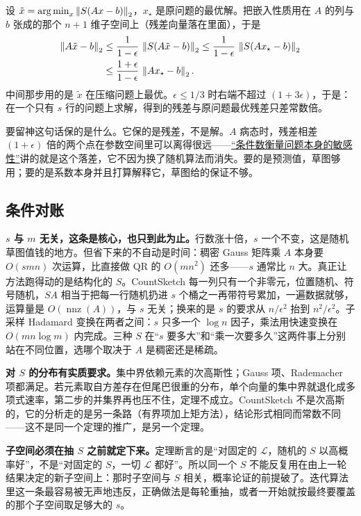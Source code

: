 设 \(\tilde x=\operatorname*{arg\,min}_x\left\lVert S(Ax-b)\right\rVert_2\)，\(x_\star\) 是原问题的最优解。把嵌入性质用在 \(A\) 的列与 \(b\) 张成的那个 \(n+1\) 维子空间上（残差向量落在里面），于是
\[
\begin{aligned}
\left\lVert A\tilde x-b\right\rVert_2
&\le\frac{1}{1-\epsilon}\,\left\lVert S(A\tilde x-b)\right\rVert_2
 \le\frac{1}{1-\epsilon}\,\left\lVert S(Ax_\star-b)\right\rVert_2\\
&\le\frac{1+\epsilon}{1-\epsilon}\,\left\lVert Ax_\star-b\right\rVert_2 .
\end{aligned}
\]
中间那步用的是 \(\tilde x\) 在压缩问题上最优。\(\epsilon\le1/3\) 时右端不超过 \((1+3\epsilon)\)，于是：在一个只有 \(s\) 行的问题上求解，得到的残差与原问题最优残差只差常数倍。

要留神这句话保的是什么。它保的是残差，不是解。\(A\) 病态时，残差相差 \((1+\epsilon)\) 倍的两个点在参数空间里可以离得很远——\hyperref[sec:08-Numerical-Analysis/01-Floating-Point-and-Error/03]{``条件数衡量问题本身的敏感性''}讲的就是这个落差，它不因为换了随机算法而消失。要的是预测值，草图够用；要的是系数本身并且打算解释它，草图给的保证不够。

\subsection{条件对账}

\textbf{\(s\) 与 \(m\) 无关，这条是核心，也只到此为止。}行数涨十倍，\(s\) 一个不变，这是随机草图值钱的地方。但省下来的不自动是时间：稠密 Gauss 矩阵乘 \(A\) 本身要 \(O(smn)\) 次运算，比直接做 QR 的 \(O(mn^2)\) 还多——\(s\) 通常比 \(n\) 大。真正让方法跑得动的是结构化的 \(S\)。CountSketch 每一列只有一个非零元，位置随机、符号随机，\(SA\) 相当于把每一行随机扔进 \(s\) 个桶之一再带符号累加，一遍数据就够，运算量是 \(O(\operatorname{nnz}(A))\)，与 \(s\) 无关；换来的是 \(s\) 的要求从 \(n/\epsilon^2\) 抬到 \(n^2/\epsilon^2\)。子采样 Hadamard 变换在两者之间：\(s\) 只多一个 \(\log n\) 因子，乘法用快速变换在 \(O(mn\log m)\) 内完成。三种 \(S\) 在``\(s\) 要多大''和``乘一次要多久''这两件事上分别站在不同位置，选哪个取决于 \(A\) 是稠密还是稀疏。

\textbf{对 \(S\) 的分布有实质要求。}集中界依赖元素的次高斯性；Gauss 项、Rademacher 项都满足。若元素取自方差存在但尾巴很重的分布，单个向量的集中界就退化成多项式速率，第二步的并集界再也压不住，定理不成立。CountSketch 不是次高斯的，它的分析走的是另一条路（有界项加上矩方法），结论形式相同而常数不同——这不是同一个定理的推广，是另一个定理。

\textbf{子空间必须在抽 \(S\) 之前就定下来。}定理断言的是``对固定的 \(\mathcal{L}\)，随机的 \(S\) 以高概率好''，不是``对固定的 \(S\)，一切 \(\mathcal{L}\) 都好''。所以同一个 \(S\) 不能反复用在由上一轮结果决定的新子空间上：那时子空间与 \(S\) 相关，概率论证的前提破了。迭代算法里这一条最容易被无声地违反，正确做法是每轮重抽，或者一开始就按最终要覆盖的那个子空间取足够大的 \(s\)。

